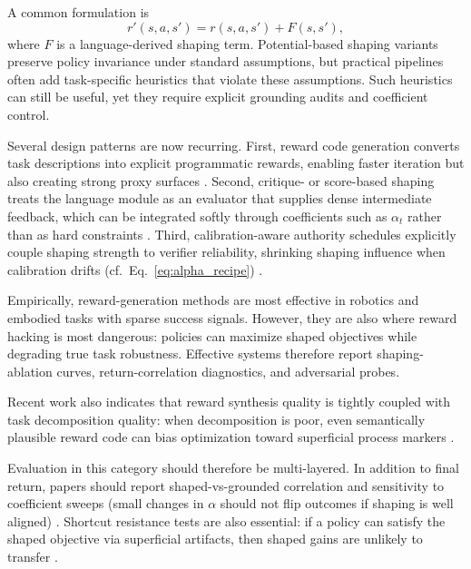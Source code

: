 ﻿\documentclass[conference]{IEEEtran}
\begin{document}
A common formulation is
\begin{equation}
r'(s,a,s') = r(s,a,s') + F(s,s'),
\label{eq:reward_shaping_general}
\end{equation}
where $F$ is a language-derived shaping term. Potential-based shaping variants preserve policy invariance under standard assumptions, but practical pipelines often add task-specific heuristics that violate these assumptions. Such heuristics can still be useful, yet they require explicit grounding audits and coefficient control.

Several design patterns are now recurring. First, reward code generation converts task descriptions into explicit programmatic rewards, enabling faster iteration but also creating strong proxy surfaces \cite{arxiv_p_2310_12931,arxiv_p_2309_11489,arxiv_p_2309_06687}. Second, critique- or score-based shaping treats the language module as an evaluator that supplies dense intermediate feedback, which can be integrated softly through coefficients such as $\alpha_t$ rather than as hard constraints \cite{arxiv_p_2602_06493,arxiv_p_2602_12579,arxiv_p_2510_20867}. Third, calibration-aware authority schedules explicitly couple shaping strength to verifier reliability, shrinking shaping influence when calibration drifts (cf.\ Eq.~\ref{eq:alpha_recipe}) \cite{arxiv_p_2602_06493,arxiv_p_2602_02395,arxiv_p_2508_03680}.

Empirically, reward-generation methods are most effective in robotics and embodied tasks with sparse success signals. However, they are also where reward hacking is most dangerous: policies can maximize shaped objectives while degrading true task robustness. Effective systems therefore report shaping-ablation curves, return-correlation diagnostics, and adversarial probes.

Recent work also indicates that reward synthesis quality is tightly coupled with task decomposition quality: when decomposition is poor, even semantically plausible reward code can bias optimization toward superficial process markers \cite{arxiv_p_2509_23863,arxiv_p_2510_10197,arxiv_p_2601_15690}.

Evaluation in this category should therefore be multi-layered. In addition to final return, papers should report shaped-vs-grounded correlation and sensitivity to coefficient sweeps (small changes in $\alpha$ should not flip outcomes if shaping is well aligned) \cite{doi_p_10_3390_app14198868,arxiv_p_2310_12931}. Shortcut resistance tests are also essential: if a policy can satisfy the shaped objective via superficial artifacts, then shaped gains are unlikely to transfer \cite{arxiv_p_2602_12579,arxiv_p_2602_14234}.
\end{document}
